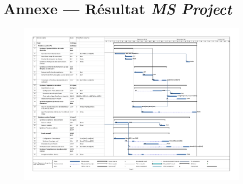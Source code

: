 \documentclass[etudiants]{support-iutrs}
\begin{document}
\newpage{}
\section{Annexe — Résultat \emph{MS Project}}

\begin{figure}[h!]
\begin{center}
\includegraphics[angle=90, width=16cm]{diagramme_gante.pdf}
\end{center}
\end{figure} 

%
%
\end{document}

